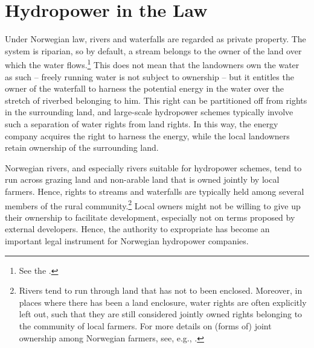 \section{Hydropower in the Law}\label{sec:hl}

Under Norwegian law, rivers and waterfalls are regarded as private property. The system is riparian, so by default, a stream belongs to the owner of the land over which the water flows.\footnote{See the \cite[13]{wra00}.} This does not mean that the landowners own the water as such -- freely running water is not subject to ownership -- but it entitles the owner of the waterfall to harness the potential energy in the water over the stretch of riverbed belonging to him. This right can be partitioned off from rights in the surrounding land, and large-scale hydropower schemes typically involve such a separation of water rights from land rights. In this way, the energy company acquires the right to harness the energy, while the local landowners retain ownership of the surrounding land.

Norwegian rivers, and especially rivers suitable for hydropower schemes, tend to run across grazing land and non-arable land that is owned jointly by local farmers. Hence, rights to streams and waterfalls are typically held among several members of the rural community.\footnote{Rivers tend to run through land that has not to been enclosed. Moreover, in places where there has been a land enclosure, water rights are often explicitly left out, such that they are still considered jointly owned rights belonging to the community of local farmers. For more details on (forms of) joint ownership among Norwegian farmers, see, e.g., \cite[570]{stenseth07}.} Local owners might not be willing to give up their ownership to facilitate development, especially not on terms proposed by external developers. Hence, the authority to expropriate has become an important legal instrument for Norwegian hydropower companies.




